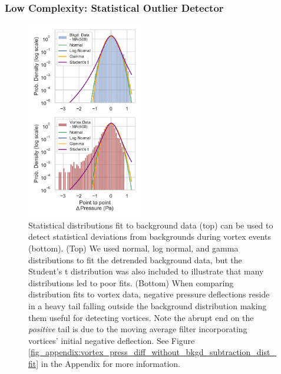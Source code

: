 \subsubsection{Low Complexity: Statistical Outlier Detector}
\begin{figure}
    \centering
    \includegraphics[width=0.45\textwidth]    {figures/manuscript_static_detector_overview_fig_v3.pdf}
    \caption{Statistical distributions fit to background data (top) can be used to detect statistical deviations from backgrounds during vortex events (bottom). (Top) We used normal, log normal, and gamma distributions to fit the detrended background data, but the Student's t distribution was also included to illustrate that many distributions led to poor fits. (Bottom) When comparing distribution fits to vortex data, negative pressure deflections reside in a heavy tail falling outside the background distribution making them useful for detecting vortices. Note the abrupt end on the \textit{positive} tail is due to the moving average filter incorporating vortices' initial negative deflection. See Figure \ref{fig_appendix:vortex_press_diff_without_bkgd_subtraction_dist_fit} in the Appendix for more information.}
    \label{fig:detector1_overview}
\end{figure}

